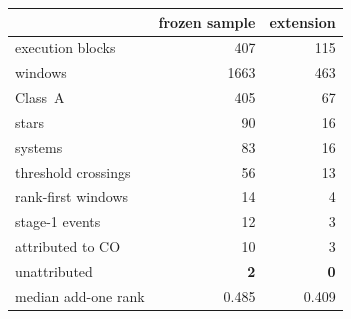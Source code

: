 \begin{tabular}{@{}lrr@{}}
\toprule
 & frozen sample & extension \\
\midrule
execution blocks & 407 & 115 \\
windows & 1663 & 463 \\
\quad Class~A & 405 & 67 \\
stars & 90 & 16 \\
systems & 83 & 16 \\
\midrule
threshold crossings & 56 & 13 \\
rank-first windows & 14 & 4 \\
stage-1 events & 12 & 3 \\
\quad attributed to CO & 10 & 3 \\
\quad unattributed & \textbf{2} & \textbf{0} \\
\midrule
median add-one rank & 0.485 & 0.409 \\
\bottomrule
\end{tabular}
